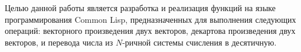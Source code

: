 
Целью данной работы является разработка и реализация функций на языке программирования Common Lisp, предназначенных для выполнения следующих операций: векторного произведения двух векторов, декартова произведения двух векторов, и перевода числа из \( N \)-ричной системы счисления в десятичную.

\clearpage
